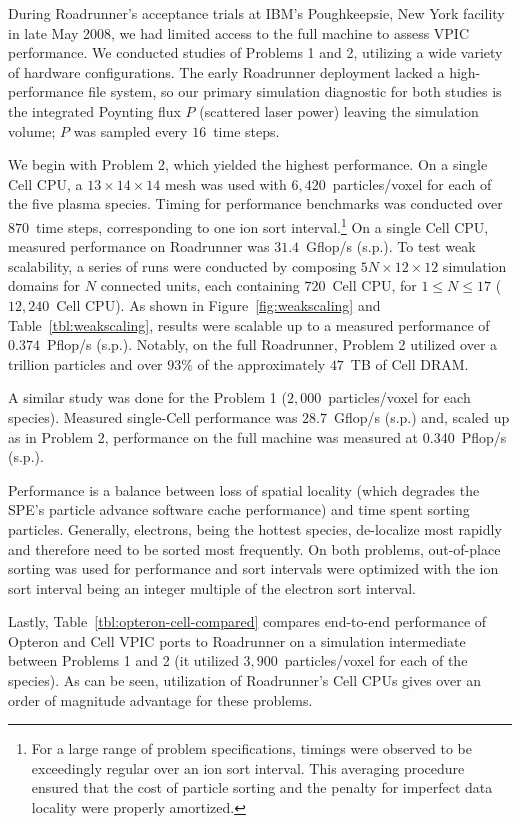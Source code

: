 \documentclass[journal,twoside]{IEEEtran}
\newcommand{\tbl}[1]{Table~\ref{tbl:#1}}
\newcommand{\fig}[1]{Figure~\ref{fig:#1}}
\begin{document}
During Roadrunner's acceptance trials at IBM's Poughkeepsie, New York
facility in late May 2008, we had limited access to the full machine
to assess VPIC performance.  We conducted studies of Problems 1 and 2,
utilizing a wide variety of hardware configurations.  The early
Roadrunner deployment lacked a high-performance file system, so our
primary simulation diagnostic for both studies is the integrated
Poynting flux $P$ (scattered laser power) leaving the simulation
volume; $P$ was sampled every $16$~time steps.

We begin with Problem 2, which yielded the highest performance.  On a
single Cell CPU, a $13 \times 14 \times 14$ mesh was used with
$6,420$~particles/voxel for each of the five plasma species.  Timing
for performance benchmarks was conducted over $870$~time steps,
corresponding to one ion sort interval.\footnote{For a large range of
problem specifications, timings were observed to be exceedingly
regular over an ion sort interval.  This averaging procedure ensured
that the cost of particle sorting and the penalty for imperfect data
locality were properly amortized.}  On a single Cell CPU, measured
performance on Roadrunner was $31.4$~Gflop/s (s.p.).  To test weak
scalability, a series of runs were conducted by composing $5N \times
12 \times 12$ simulation domains for $N$ connected units, each
containing $720$~Cell CPU, for $1 \le N \le 17$ ($12,240$~Cell CPU).
As shown in \fig{weakscaling} and \tbl{weakscaling}, results were
scalable up to a measured performance of $0.374$~Pflop/s (s.p.).
Notably, on the full Roadrunner, Problem 2 utilized over a trillion
particles and over $93\%$ of the approximately $47$~TB of Cell DRAM.

A similar study was done for the Problem 1 ($2,000$~particles/voxel
for each species).  Measured single-Cell performance was
$28.7$~Gflop/s (s.p.) and, scaled up as in Problem 2, performance on
the full machine was measured at $0.340$~Pflop/s (s.p.).

Performance is a balance between loss of spatial locality (which
degrades the SPE's particle advance software cache performance) and
time spent sorting particles.  Generally, electrons, being the hottest
species, de-localize most rapidly and therefore need to be sorted most
frequently.  On both problems, out-of-place sorting was used for
performance and sort intervals were optimized with the ion sort
interval being an integer multiple of the electron sort interval.

Lastly, \tbl{opteron-cell-compared} compares end-to-end performance of
Opteron and Cell VPIC ports to Roadrunner on a simulation intermediate
between Problems 1 and 2 (it utilized $3,900$~particles/voxel for each
of the species).  As can be seen, utilization of Roadrunner's Cell
CPUs gives over an order of magnitude advantage for these problems.
\end{document}
